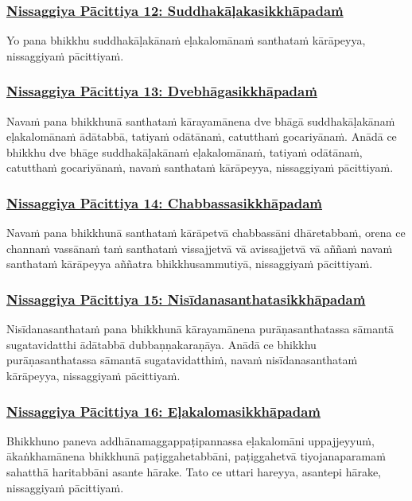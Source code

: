 \subsubsection*{\hyperref[forf-exp12]{Nissaggiya Pācittiya 12: Suddhakāḷakasikkhāpadaṁ}}
\label{np12}
Yo pana bhikkhu suddhakāḷakānaṁ eḷakalomānaṁ santhataṁ kārāpeyya, nissaggiyaṁ pācittiyaṁ.

\subsubsection*{\hyperref[forf-exp13]{Nissaggiya Pācittiya 13: Dvebhāgasikkhāpadaṁ}}
\label{np13}
Navaṁ pana bhikkhunā santhataṁ kārayamānena dve bhāgā suddhakāḷakānaṁ eḷakalomānaṁ ādātabbā, tatiyaṁ odātānaṁ, catutthaṁ gocariyānaṁ. Anādā ce bhikkhu dve bhāge suddhakāḷakānaṁ eḷakalomānaṁ, tatiyaṁ odātānaṁ, catutthaṁ gocariyānaṁ, navaṁ santhataṁ kārāpeyya, nissaggiyaṁ pācittiyaṁ.

\subsubsection*{\hyperref[forf-exp14]{Nissaggiya Pācittiya 14: Chabbassasikkhāpadaṁ}}
\label{np14}
Navaṁ pana bhikkhunā santhataṁ kārāpetvā chabbassāni dhāretabbaṁ, orena ce channaṁ vassānaṁ taṁ santhataṁ vissajjetvā vā avissajjetvā vā aññaṁ navaṁ santhataṁ kārāpeyya aññatra bhikkhusammutiyā, nissaggiyaṁ pācittiyaṁ.

\subsubsection*{\hyperref[forf-exp15]{Nissaggiya Pācittiya 15: Nisīdanasanthatasikkhāpadaṁ}}
\label{np15}
Nisīdanasanthataṁ pana bhikkhunā kārayamānena purāṇasanthatassa sāmantā sugatavidatthi ādātabbā dubbaṇṇakaraṇāya. Anādā ce bhikkhu purāṇasanthatassa sāmantā sugatavidatthiṁ, navaṁ nisīdanasanthataṁ kārāpeyya, nissaggiyaṁ pācittiyaṁ.

\subsubsection*{\hyperref[forf-exp16]{Nissaggiya Pācittiya 16: Eḷakalomasikkhāpadaṁ}}
\label{np16}
Bhikkhuno paneva addhānamaggappaṭipannassa eḷakalomāni uppajjeyyuṁ, ākaṅkhamānena bhikkhunā paṭiggahetabbāni, paṭiggahetvā tiyojanaparamaṁ sahatthā haritabbāni asante hārake. Tato ce uttari hareyya, asantepi hārake, nissaggiyaṁ pācittiyaṁ.

